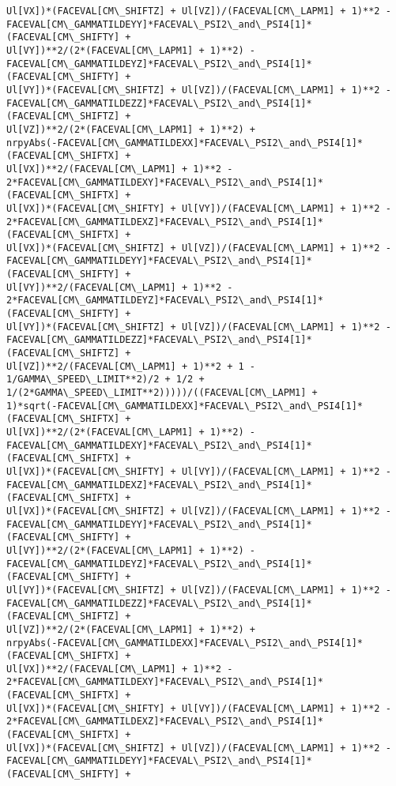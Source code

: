 \documentclass[landscape,letterpaper,10pt,english]{article}
\begin{document}
\begin{Verbatim}[commandchars=\\\{\}]
Ul[VX])*(FACEVAL[CM\_SHIFTZ] + Ul[VZ])/(FACEVAL[CM\_LAPM1] + 1)**2 -
FACEVAL[CM\_GAMMATILDEYY]*FACEVAL\_PSI2\_and\_PSI4[1]*(FACEVAL[CM\_SHIFTY] +
Ul[VY])**2/(2*(FACEVAL[CM\_LAPM1] + 1)**2) -
FACEVAL[CM\_GAMMATILDEYZ]*FACEVAL\_PSI2\_and\_PSI4[1]*(FACEVAL[CM\_SHIFTY] +
Ul[VY])*(FACEVAL[CM\_SHIFTZ] + Ul[VZ])/(FACEVAL[CM\_LAPM1] + 1)**2 -
FACEVAL[CM\_GAMMATILDEZZ]*FACEVAL\_PSI2\_and\_PSI4[1]*(FACEVAL[CM\_SHIFTZ] +
Ul[VZ])**2/(2*(FACEVAL[CM\_LAPM1] + 1)**2) +
nrpyAbs(-FACEVAL[CM\_GAMMATILDEXX]*FACEVAL\_PSI2\_and\_PSI4[1]*(FACEVAL[CM\_SHIFTX] +
Ul[VX])**2/(FACEVAL[CM\_LAPM1] + 1)**2 -
2*FACEVAL[CM\_GAMMATILDEXY]*FACEVAL\_PSI2\_and\_PSI4[1]*(FACEVAL[CM\_SHIFTX] +
Ul[VX])*(FACEVAL[CM\_SHIFTY] + Ul[VY])/(FACEVAL[CM\_LAPM1] + 1)**2 -
2*FACEVAL[CM\_GAMMATILDEXZ]*FACEVAL\_PSI2\_and\_PSI4[1]*(FACEVAL[CM\_SHIFTX] +
Ul[VX])*(FACEVAL[CM\_SHIFTZ] + Ul[VZ])/(FACEVAL[CM\_LAPM1] + 1)**2 -
FACEVAL[CM\_GAMMATILDEYY]*FACEVAL\_PSI2\_and\_PSI4[1]*(FACEVAL[CM\_SHIFTY] +
Ul[VY])**2/(FACEVAL[CM\_LAPM1] + 1)**2 -
2*FACEVAL[CM\_GAMMATILDEYZ]*FACEVAL\_PSI2\_and\_PSI4[1]*(FACEVAL[CM\_SHIFTY] +
Ul[VY])*(FACEVAL[CM\_SHIFTZ] + Ul[VZ])/(FACEVAL[CM\_LAPM1] + 1)**2 -
FACEVAL[CM\_GAMMATILDEZZ]*FACEVAL\_PSI2\_and\_PSI4[1]*(FACEVAL[CM\_SHIFTZ] +
Ul[VZ])**2/(FACEVAL[CM\_LAPM1] + 1)**2 + 1 - 1/GAMMA\_SPEED\_LIMIT**2)/2 + 1/2 +
1/(2*GAMMA\_SPEED\_LIMIT**2)))))/((FACEVAL[CM\_LAPM1] +
1)*sqrt(-FACEVAL[CM\_GAMMATILDEXX]*FACEVAL\_PSI2\_and\_PSI4[1]*(FACEVAL[CM\_SHIFTX] +
Ul[VX])**2/(2*(FACEVAL[CM\_LAPM1] + 1)**2) -
FACEVAL[CM\_GAMMATILDEXY]*FACEVAL\_PSI2\_and\_PSI4[1]*(FACEVAL[CM\_SHIFTX] +
Ul[VX])*(FACEVAL[CM\_SHIFTY] + Ul[VY])/(FACEVAL[CM\_LAPM1] + 1)**2 -
FACEVAL[CM\_GAMMATILDEXZ]*FACEVAL\_PSI2\_and\_PSI4[1]*(FACEVAL[CM\_SHIFTX] +
Ul[VX])*(FACEVAL[CM\_SHIFTZ] + Ul[VZ])/(FACEVAL[CM\_LAPM1] + 1)**2 -
FACEVAL[CM\_GAMMATILDEYY]*FACEVAL\_PSI2\_and\_PSI4[1]*(FACEVAL[CM\_SHIFTY] +
Ul[VY])**2/(2*(FACEVAL[CM\_LAPM1] + 1)**2) -
FACEVAL[CM\_GAMMATILDEYZ]*FACEVAL\_PSI2\_and\_PSI4[1]*(FACEVAL[CM\_SHIFTY] +
Ul[VY])*(FACEVAL[CM\_SHIFTZ] + Ul[VZ])/(FACEVAL[CM\_LAPM1] + 1)**2 -
FACEVAL[CM\_GAMMATILDEZZ]*FACEVAL\_PSI2\_and\_PSI4[1]*(FACEVAL[CM\_SHIFTZ] +
Ul[VZ])**2/(2*(FACEVAL[CM\_LAPM1] + 1)**2) +
nrpyAbs(-FACEVAL[CM\_GAMMATILDEXX]*FACEVAL\_PSI2\_and\_PSI4[1]*(FACEVAL[CM\_SHIFTX] +
Ul[VX])**2/(FACEVAL[CM\_LAPM1] + 1)**2 -
2*FACEVAL[CM\_GAMMATILDEXY]*FACEVAL\_PSI2\_and\_PSI4[1]*(FACEVAL[CM\_SHIFTX] +
Ul[VX])*(FACEVAL[CM\_SHIFTY] + Ul[VY])/(FACEVAL[CM\_LAPM1] + 1)**2 -
2*FACEVAL[CM\_GAMMATILDEXZ]*FACEVAL\_PSI2\_and\_PSI4[1]*(FACEVAL[CM\_SHIFTX] +
Ul[VX])*(FACEVAL[CM\_SHIFTZ] + Ul[VZ])/(FACEVAL[CM\_LAPM1] + 1)**2 -
FACEVAL[CM\_GAMMATILDEYY]*FACEVAL\_PSI2\_and\_PSI4[1]*(FACEVAL[CM\_SHIFTY] +

\end{Verbatim}
\end{document}
